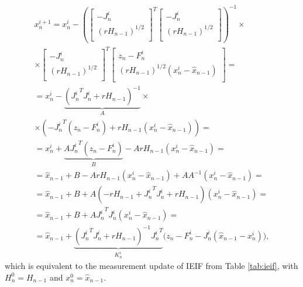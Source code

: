  \begin{align*}
x_n^{i + 1}= x_n^{i} - \left(
\left[
	\begin{array}{cc}
		- J_n^i \\
		\left(r H_{n - 1}\right)^{1/2} \\
	\end{array}
\right]^T 
\left[
	\begin{array}{c}
		- J_n^i \\
		\left(r H_{n - 1}\right)^{1/2} \\
	\end{array}
\right]
\right)^{-1} \times\\
\times \left[
	\begin{array}{cc}
		- J_n^i \\
		\left(r H_{n - 1}\right)^{1/2} \\
	\end{array}
\right]^T 
\left[
	\begin{array}{c}
		z_n - F_n^i \\
		\left(r H_{n - 1}\right)^{1/2}(x_n^i - \hat{x}_{n - 1}) \\
	\end{array}
\right] = \\
= x_n^{i} - \underbrace{\left({J_n^i}^T J_n^i + r H_{n - 1}\right)^{-1}}_{A} \times \\
\times \left( - {J_n^i}^T(z_n - F_n^i) + r H_{n - 1}(x_n^i - \hat{x}_{n - 1})\right)  = \\
= x_n^i +\underbrace{A {J_n^i}^T(z_n - F_n^i)}_B - A r H_{n - 1}(x_n^i - \hat{x}_{n - 1})  = \\
= \hat{x}_{n - 1} + B  - A r H_{n - 1}(x_n^i - \hat{x}_{n - 1}) + A A^{-1}( x_n^i - \hat{x}_{n - 1}) = \\
= \hat{x}_{n - 1} + B + A(- r H_{n - 1} + {J_n^i}^T J_n^i + r H_{n - 1})(x_n^i - \hat{x}_{n - 1}) = \\
= \hat{x}_{n - 1} + B + A {J_n^i}^T J_n^i (x_n^i - \hat{x}_{n - 1}) = \\
= \hat{x}_{n - 1} + \underbrace{\left({J_n^i}^T J_n^i + r H_{n - 1}\right)^{-1} {J_n^i}^T}_{K_n^i}  \big(z_n - F_n^i - J_n^i (\hat{x}_{n - 1} - x_n^i)\big),
\end{align*}
% 
which is equivalent to the measurement update of IEIF from Table \ref{tab:ieif}, with $H_n^0 = H_{n-1}$ and $x_n^0 = \hat{x}_{n - 1}$.

% 
